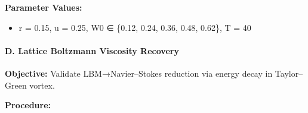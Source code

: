 \documentclass[
]{article}
\providecommand{\tightlist}{%
  \setlength{\itemsep}{0pt}\setlength{\parskip}{0pt}}
\begin{document}
\textbf{Parameter Values:}

\begin{itemize}
\tightlist
\item
  r = 0.15, u = 0.25, W0 ∈ \{0.12, 0.24, 0.36, 0.48, 0.62\}, T = 40
\end{itemize}

\hypertarget{d.-lattice-boltzmann-viscosity-recovery}{%
\paragraph{D. Lattice Boltzmann Viscosity
Recovery}\label{d.-lattice-boltzmann-viscosity-recovery}}

\textbf{Objective:} Validate LBM→Navier--Stokes reduction via energy
decay in Taylor--Green vortex.

\textbf{Procedure:}
\end{document}
